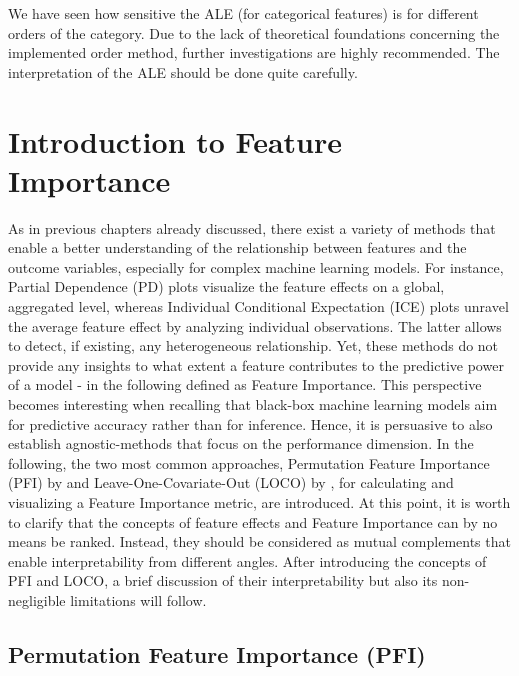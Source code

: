 \documentclass[
]{krantz}
\begin{document}
We have seen how sensitive the ALE (for categorical features) is for different orders of the category. Due to the lack of theoretical foundations concerning the implemented order method, further investigations are highly recommended. The interpretation of the ALE should be done quite carefully.

\hypertarget{introduction-to-feature-importance}{%
\chapter{Introduction to Feature Importance}\label{introduction-to-feature-importance}}

As in previous chapters already discussed, there exist a variety of methods that enable a better understanding of the relationship between features and the outcome variables, especially for complex machine learning models. For instance, Partial Dependence (PD) plots visualize the feature effects on a global, aggregated level, whereas Individual Conditional Expectation (ICE) plots unravel the average feature effect by analyzing individual observations. The latter allows to detect, if existing, any heterogeneous relationship. Yet, these methods do not provide any insights to what extent a feature contributes to the predictive power of a model - in the following defined as Feature Importance. This perspective becomes interesting when recalling that black-box machine learning models aim for predictive accuracy rather than for inference. Hence, it is persuasive to also establish agnostic-methods that focus on the performance dimension. In the following, the two most common approaches, Permutation Feature Importance (PFI) by \citet{breiman2001random} and Leave-One-Covariate-Out (LOCO) by \citet{lei2018distribution}, for calculating and visualizing a Feature Importance metric, are introduced. At this point, it is worth to clarify that the concepts of feature effects and Feature Importance can by no means be ranked. Instead, they should be considered as mutual complements that enable interpretability from different angles. After introducing the concepts of PFI and LOCO, a brief discussion of their interpretability but also its non-negligible limitations will follow.

\hypertarget{permutation-feature-importance-pfi}{%
\section{Permutation Feature Importance (PFI)}\label{permutation-feature-importance-pfi}}
\end{document}

